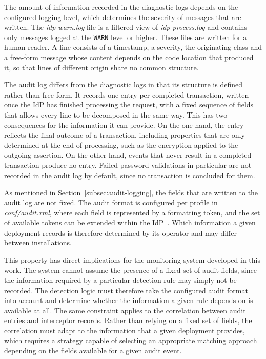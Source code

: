 \documentclass[../main.tex]{subfiles}
\begin{document}
The amount of information recorded in the diagnostic logs depends on the configured logging 
level, which determines the severity of messages that are written. 
The \textit{idp-warn.log} file is a filtered view of \textit{idp-process.log} and contains only 
messages logged at the \texttt{WARN} level or higher. 
These files are written for a human reader. 
A line consists of a timestamp, a severity, the originating class and a free-form message whose 
content depends on the code location that produced it, so that lines of different origin share 
no common structure. 

The audit log differs from the diagnostic logs in that its structure is defined rather than 
free-form. 
It records one entry per completed transaction, written once the IdP has finished processing 
the request, with a fixed sequence of fields that allows every line to be decomposed in the 
same way. 
This has two consequences for the information it can provide. 
On the one hand, the entry reflects the final outcome of a transaction, including properties 
that are only determined at the end of processing, such as the encryption applied to the 
outgoing assertion. 
On the other hand, events that never result in a completed transaction produce no entry. 
Failed password validations in particular are not recorded in the audit log by default, since 
no transaction is concluded for them. 

As mentioned in Section~\ref{subsec:audit-logging}, the fields that are written to the audit 
log are not fixed. 
The audit format is configured per profile in \textit{conf/audit.xml}, where each field is 
represented by a formatting token, and the set of available tokens can be extended within the 
IdP~\cite{AuditLoggingConfiguration}. 
Which information a given deployment records is therefore determined by its operator and 
may differ between installations. 

This property has direct implications for the monitoring system developed in this work. 
The system cannot assume the presence of a fixed set of audit fields, since the information 
required by a particular detection rule may simply not be recorded. 
The detection logic must therefore take the configured audit format into account and determine 
whether the information a given rule depends on is available at all. 
The same constraint applies to the correlation between audit entries and interceptor records. 
Rather than relying on a fixed set of fields, the correlation must adapt to the information 
that a given deployment provides, which requires a strategy capable of selecting an appropriate 
matching approach depending on the fields available for a given audit event. 
\end{document}
